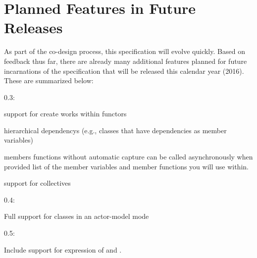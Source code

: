 \section{Planned Features in Future Releases}
\label{sec:future}

As part of the \gls{co-design} process, this specification will evolve quickly.
  Based on feedback thus far, there are already
many additional features planned for future incarnations of the specification that
will be released this calendar year (2016).  These are summarized below:

\begin{compactdesc}
\item[0.3:]
\begin{compactitem}
\item support for create works within functors 
\item hierarchical \glspl{dependency} (e.g., classes that have dependencies as
    member variables)
\item members functions without automatic capture can be called asynchronously
when provided list of the member variables and member functions you will use
within. 
\item support for collectives
\end{compactitem}
\item[0.4:]
\begin{compactitem}
\item Full support for classes in an actor-model mode 
\end{compactitem}
\item[0.5:]
\begin{compactitem}
\item Include support for expression of  and
  .
\end{compactitem}
\end{compactdesc}
